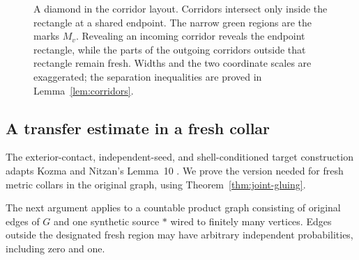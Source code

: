 \documentclass[11pt]{article}
\theoremstyle{definition}
\begin{document}
\begin{figure}[htbp]
\centering
{}
\caption{A diamond in the corridor layout. Corridors intersect only
inside the rectangle at a shared endpoint. The narrow green regions
are the marks $M_v$. Revealing an incoming corridor reveals the
endpoint rectangle, while the parts of the outgoing corridors outside
that rectangle remain fresh. Widths and the two coordinate scales are exaggerated;
the separation inequalities are proved in Lemma~\ref{lem:corridors}.}
\label{fig:corridors}
\end{figure}


\subsection{A transfer estimate in a fresh collar}

The exterior-contact, independent-seed, and shell-conditioned target
construction adapts Kozma and Nitzan's Lemma~10
\cite[Section~4]{KozmaNitzan2024}. We prove the version needed for fresh
metric collars in the original graph, using Theorem~\ref{thm:joint-gluing}.

The next argument applies to a countable product graph consisting of
original edges of $G$ and one synthetic source $*$ wired to finitely
many vertices. Edges outside the designated fresh region may have
arbitrary independent probabilities, including zero and one.
\end{document}
